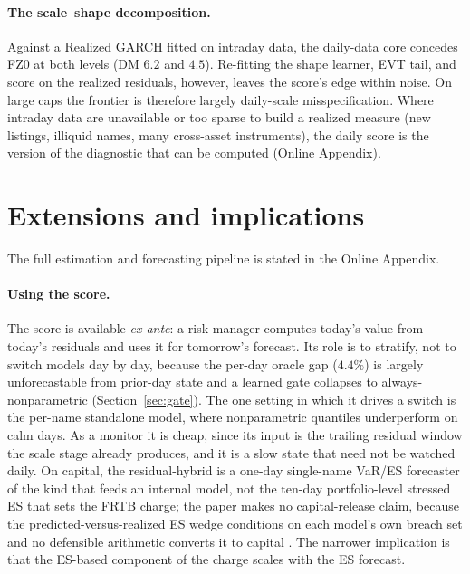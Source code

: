 \documentclass[11pt]{article}
\theoremstyle{remark}
\begin{document}
\paragraph{The scale--shape decomposition.} Against a Realized GARCH \citep{hansen2012realized} fitted on intraday data, the daily-data core concedes FZ0 at both levels (DM $6.2$ and $4.5$). Re-fitting the shape learner, EVT tail, and score on the realized residuals, however, leaves the score's edge within noise. On large caps the frontier is therefore largely daily-scale misspecification. Where intraday data are unavailable or too sparse to build a realized measure (new listings, illiquid names, many cross-asset instruments), the daily score is the version of the diagnostic that can be computed (Online Appendix).

\section{Extensions and implications}\label{sec:applications}

\noindent The full estimation and forecasting pipeline is stated in the Online Appendix.

\paragraph{Using the score.} The score is available \emph{ex ante}: a
risk manager computes today's value from today's residuals and uses it
for tomorrow's forecast. Its role is to stratify, not to switch models
day by day, because the per-day oracle gap ($4.4\%$) is largely unforecastable from
prior-day state and a learned gate collapses to always-nonparametric
(Section~\ref{sec:gate}). The one setting in which it drives a switch is
the per-name standalone model, where nonparametric quantiles underperform
on calm days. As a monitor it is cheap, since its input is the trailing
residual window the scale stage already produces, and it is a slow state
that need not be watched daily. On capital, the residual-hybrid is a
one-day single-name VaR/ES forecaster of the kind that feeds an internal
model, not the ten-day portfolio-level stressed ES that sets the FRTB
charge; the paper makes no capital-release claim, because the
predicted-versus-realized ES wedge conditions on each model's own breach
set and no defensible arithmetic converts it to capital
\citep{bcbs2019frtb}. The narrower implication is that the ES-based
component of the charge scales with the ES forecast.
\end{document}
